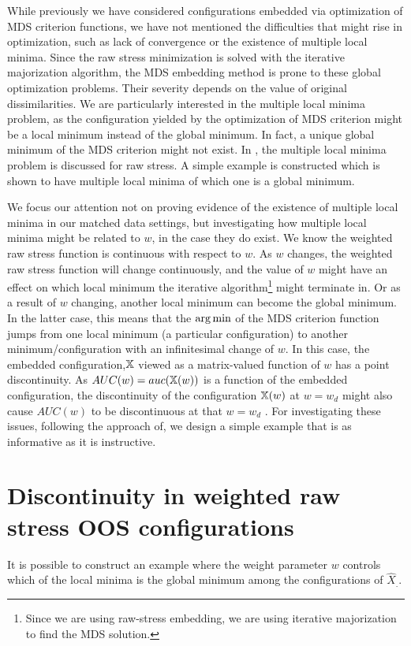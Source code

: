 \documentclass[12pt,oneside,final]{thesis}\usepackage[]{graphicx}\usepackage[]{color}
\begin{document}
While previously we have considered  configurations embedded via optimization of  MDS criterion functions,   we have not mentioned  the difficulties that might rise in optimization, such as lack of convergence or the existence  of  multiple local minima. Since the raw stress minimization is solved with the iterative majorization algorithm, the MDS embedding method is prone to these global optimization problems. Their severity depends on the value of  original dissimilarities. We are particularly interested in the multiple local minima problem, as the configuration yielded by the  optimization of MDS criterion might be  a local minimum instead of the global minimum. In fact, a unique global minimum of the MDS criterion might not exist. In \cite{TrossetLocalMin}, the multiple local minima problem is discussed for raw stress. A simple example is constructed which is shown to have multiple local minima of which one is a global minimum.


We focus our attention not  on proving  evidence of the existence of multiple local minima  in our matched data settings, but investigating how multiple local minima might be related to $w$, in the case they do exist. We know the weighted raw stress function is continuous with respect to $w$. As $w$ changes, the weighted raw stress function will change continuously, and the value of $w$ might have an  effect on  which local minimum  the iterative algorithm\footnote{Since we are using raw-stress embedding, we are using iterative majorization to find the MDS solution.} might terminate in. Or as a result of $w$ changing,  another local minimum can become the global minimum. In the latter case, this means that the $\arg\min$ of the MDS criterion function jumps from one local minimum (a particular configuration) to another minimum/configuration with an infinitesimal change of $w$. In this case, the embedded configuration,$\mathbb{X}$ viewed as a matrix-valued function of $w$ has a point discontinuity. As $AUC(w)=auc(\mathbb{X} (w))$ is a function of the embedded configuration, the discontinuity of the configuration $\mathbb{X}(w)$ at $w= w_{d}$ might also cause $AUC(w)$ to be discontinuous at that $w=w_{d}$ .   For investigating these issues, following the approach of\cite{TrossetLocalMin}, we design a simple example that is as informative as it is instructive.  

\section{ Discontinuity in weighted raw stress OOS configurations\label{subsubsec:Discontinuity}}
 It is  possible to construct an example  where the weight parameter $w$ controls which of the local minima is the global minimum among the configurations of $\hat{X}_{.}$.
\end{document}
